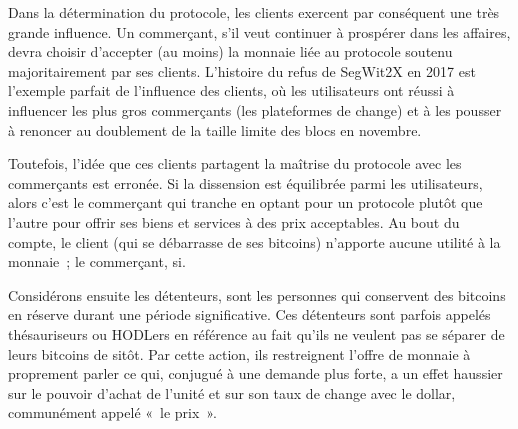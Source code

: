 Dans la détermination du protocole, les clients exercent par conséquent une très grande influence. Un commerçant, s'il veut continuer à prospérer dans les affaires, devra choisir d'accepter (au moins) la monnaie liée au protocole soutenu majoritairement par ses clients. L'histoire du refus de SegWit2X en 2017 est l'exemple parfait de l'influence des clients, où les utilisateurs ont réussi à influencer les plus gros commerçants (les plateformes de change) et à les pousser à renoncer au doublement de la taille limite des blocs en novembre.

Toutefois, l'idée que ces clients partagent la maîtrise du protocole avec les commerçants est erronée. Si la dissension est équilibrée parmi les utilisateurs, alors c'est le commerçant qui tranche en optant pour un protocole plutôt que l'autre pour offrir ses biens et services à des prix acceptables. Au bout du compte, le client (qui se débarrasse de ses bitcoins) n'apporte aucune utilité à la monnaie~; le commerçant, si.


Considérons ensuite les détenteurs, sont les personnes qui conservent des bitcoins en réserve durant une période significative. Ces détenteurs sont parfois appelés thésauriseurs ou HODLers en référence au fait qu'ils ne veulent pas se séparer de leurs bitcoins de sitôt. Par cette action, ils restreignent l'offre de monnaie à proprement parler ce qui, conjugué à une demande plus forte, a un effet haussier sur le pouvoir d'achat de l'unité et sur son taux de change avec le dollar, communément appelé «~le prix~».

